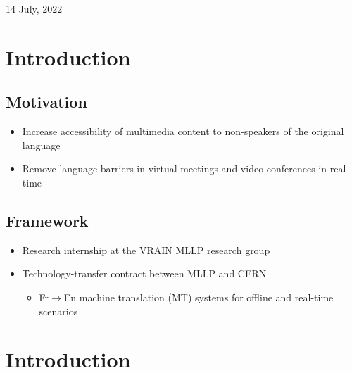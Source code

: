 \documentclass[landscape]{article}
\renewcommand{\today}{14 July, 2022}
\begin{document}
\centerline{\today}
\vfill

\clearpage

 
\hypertarget{INDEX}{}

\tableofcontents


\cp 
\section{Introduction}
\vspace*{10mm}
\subsection*{Motivation}
\vspace*{5mm}
\begin{itemize}\itemsep=5mm
	\item Increase accessibility of multimedia content to non-speakers of the original language
	\item Remove language barriers in virtual meetings and video-conferences in real time
\end{itemize}

\subsection*{Framework}
\vspace*{5mm}
\begin{itemize}\itemsep=5mm
	\item Research internship at the VRAIN MLLP research group
	\item Technology-transfer contract between MLLP and CERN
	\begin{itemize}
		\item Fr$\to$En machine translation (MT) systems for offline and real-time scenarios
	\end{itemize}
\end{itemize}


\cp
\section*{Introduction}
\vspace*{10mm}
\end{document}
